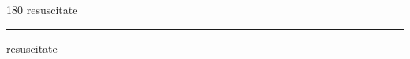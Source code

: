 
\begin{frame}
\begin{center}
\begin{turn}{180}
{\fontsize{2.5cm}{1em}\selectfont resuscitate}
\end{turn}
\vspace{1em}\par  
\hrule
\vspace{1em}\par  
{\fontsize{2.5cm}{1em}\selectfont resuscitate}
\end{center}
\end{frame}
